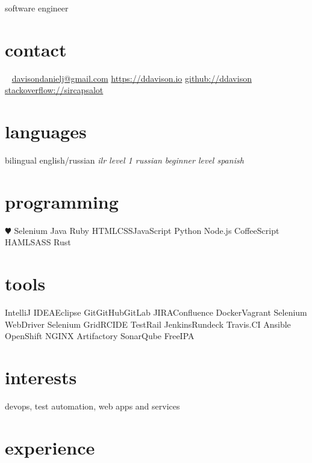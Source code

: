 \documentclass[]{ddavison-resume}
\begin{document}
       {software engineer}


\begin{aside}
  \section{contact}
    ~
    \href{mailto:davisondanielj@gmail.com}{davisondanielj@gmail.com}
    \href{https://ddavison.io}{https://ddavison.io}
    \href{https://github.com/ddavison}{github://ddavison}
    \href{https://stackoverflow.com/users/1695163/sircapsalot}{stackoverflow://sircapsalot}
  \section{languages}
    bilingual english/russian
	\emph{ilr level 1 russian}
	\emph{beginner level spanish}
  \section{programming}
    {\color{red} $\varheartsuit$} Selenium
	Java     
    Ruby
    HTML\bullet CSS\bullet JavaScript
    Python    
    Node.js
    CoffeeScript
    HAML\bullet SASS
    Rust
  \section{tools}
	IntelliJ IDEA\bullet Eclipse  	
	Git\bullet GitHub\bullet GitLab	
  	JIRA\bullet Confluence
  	Docker\bullet Vagrant
  	Selenium WebDriver
  	Selenium Grid\bullet RC\bullet IDE
  	TestRail
  	Jenkins\bullet Rundeck
  	Travis.CI
  	Ansible
  	OpenShift
  	NGINX
  	Artifactory
  	SonarQube
  	FreeIPA
\end{aside}

\section{interests}

devops, test automation, web apps and services

\section{experience}
\end{document}
